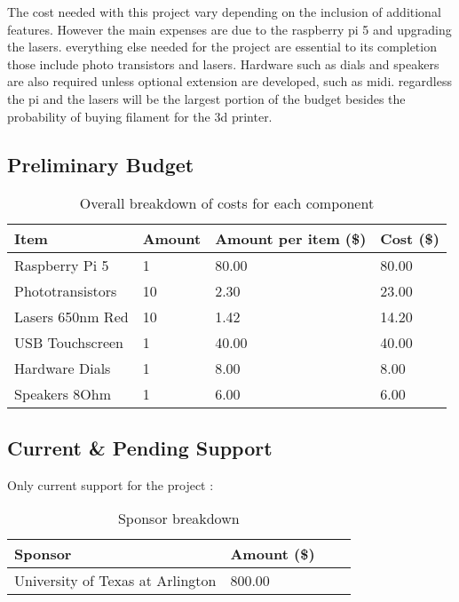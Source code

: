 The cost needed with this project vary depending on the inclusion of additional features. However the main expenses are due to the raspberry pi 5 and upgrading the lasers. everything else needed for the project are essential to its completion those include photo transistors and lasers. Hardware such as dials and speakers are also required unless optional extension are developed, such as midi. regardless the pi and the lasers will be the largest portion of the budget besides the probability of buying filament for the 3d printer.

\subsection{Preliminary Budget}

\begin{table}[H]
\centering  %
\begin{tabular}{|l|l|l|l|}
\hline
\textbf{Item} & \textbf{Amount} & \textbf{Amount per item (\$)} & \textbf{Cost (\$)} \\ \hline
Raspberry Pi 5 & 1 & 80.00 & 80.00 \\ \hline
Phototransistors & 10 & 2.30 & 23.00 \\ \hline
Lasers 650nm Red & 10 & 1.42 & 14.20 \\ \hline
USB Touchscreen & 1 & 40.00 & 40.00 \\ \hline
Hardware Dials & 1 & 8.00 & 8.00 \\ \hline
Speakers 8Ohm & 1 & 6.00 & 6.00 \\ \hline
\end{tabular}
\caption{Overall breakdown of costs for each component}
\end{table}

\subsection{Current \& Pending Support}
Only current support for the project :

    
\begin{table}[H]
\centering  %
\begin{tabular}{|l|l|l|l|}
\hline
\textbf{Sponsor} &  \textbf{Amount (\$)}  \\ \hline
University of Texas at Arlington & 800.00\\ \hline

\end{tabular}
\caption{Sponsor breakdown}
\end{table}                                                                                
